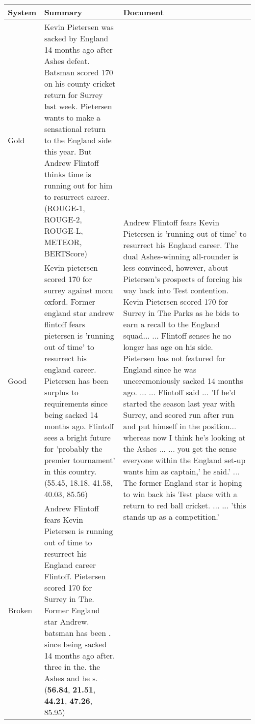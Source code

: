 \documentclass[11pt]{article}
\theoremstyle{remark}
\begin{document}
\begin{table*}[!t]
\scriptsize
\begin{tabularx}{\textwidth}{p{}Xp{}}
\hline
System &
  Summary &
  Document \\
\hline
Gold &
  Kevin Pietersen was sacked by   England 14 months ago after Ashes defeat. Batsman scored 170 on his county   cricket return for Surrey last week. Pietersen wants to make a sensational   return to the England side this year. But Andrew Flintoff thinks time is running   out for him to resurrect career. \hfill (ROUGE-1, ROUGE-2, ROUGE-L, METEOR, BERTScore)&
  \multirow{6}{16\baselineskip }{Andrew Flintoff fears   Kevin Pietersen is 'running out of time' to resurrect his England career. The   dual Ashes-winning all-rounder is less convinced, however, about Pietersen's   prospects of forcing his way back into Test contention. Kevin Pietersen scored   170 for Surrey in The Parks as he bids to earn a recall to the England   squad... ... Flintoff senses he no longer has age on his side. Pietersen has   not featured for England since he was unceremoniously sacked 14 months ago.   ... ... Flintoff said ... 'If he'd started the season last year with Surrey, and   scored run after run and put himself in the position... whereas now I think   he's looking at the Ashes ... ... you get the sense everyone within the England   set-up wants him as captain,' he said.' ... The former England star is hoping   to win back his Test place with a return to red ball cricket. ... ...  'this stands up as a competition.'} \\
\cellcolor{mygray}
Good \cite{liu-liu-2021-simcls}&
\cellcolor{mygray}
  Kevin   pietersen scored 170 for surrey against mccu oxford. Former england star   andrew flintoff fears pietersen is 'running out of time' to resurrect his   england career. Pietersen has been surplus to requirements since being sacked   14 months ago. Flintoff sees a bright future for 'probably the premier   tournament' in this country. \hfill(55.45, 18.18, 41.58, 40.03, 85.56) &
   \\
Broken&
  \textcolor{mypurple}{Andrew Flintoff fears Kevin Pietersen is running out of time to resurrect his England career Flintoff. Pietersen scored 170 for   Surrey in The.  Former England star   Andrew.  batsman has been .  since being sacked 14 months ago   after.  three in the.  the Ashes and he s.}  \hspace{100pt}\textcolor{white}{>}\,\hfill (\textbf{56.84}, \textbf{21.51}, \textbf{44.21}, \textbf{47.26}, 85.95) &

\end{tabularx}
\end{table*}
\end{document}
